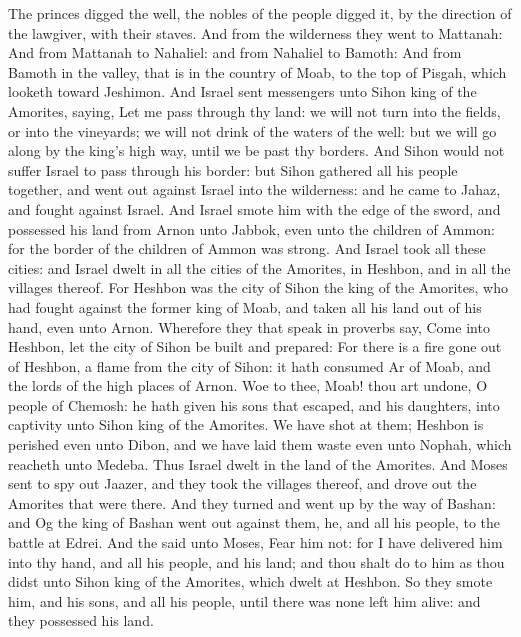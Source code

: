 \begin{biblechapter}
\verse The princes digged the well, the nobles of the people digged it, by the direction of the lawgiver, with their staves. And from the wilderness they went to Mattanah:
\verse And from Mattanah to Nahaliel: and from Nahaliel to Bamoth:
\verse And from Bamoth in the valley, that is in the country of Moab, to the top of Pisgah, which looketh toward Jeshimon.
 And Israel sent messengers unto Sihon king of the Amorites, saying,
\verse Let me pass through thy land: we will not turn into the fields, or into the vineyards; we will not drink of the waters of the well: but we will go along by the king's high way, until we be past thy borders.
\verse And Sihon would not suffer Israel to pass through his border: but Sihon gathered all his people together, and went out against Israel into the wilderness: and he came to Jahaz, and fought against Israel.
\verse And Israel smote him with the edge of the sword, and possessed his land from Arnon unto Jabbok, even unto the children of Ammon: for the border of the children of Ammon was strong.
\verse And Israel took all these cities: and Israel dwelt in all the cities of the Amorites, in Heshbon, and in all the villages thereof.
\verse For Heshbon was the city of Sihon the king of the Amorites, who had fought against the former king of Moab, and taken all his land out of his hand, even unto Arnon.
\verse Wherefore they that speak in proverbs say, Come into Heshbon, let the city of Sihon be built and prepared:
\verse For there is a fire gone out of Heshbon, a flame from the city of Sihon: it hath consumed Ar of Moab, and the lords of the high places of Arnon.
\verse Woe to thee, Moab! thou art undone, O people of Chemosh: he hath given his sons that escaped, and his daughters, into captivity unto Sihon king of the Amorites.
\verse We have shot at them; Heshbon is perished even unto Dibon, and we have laid them waste even unto Nophah, which reacheth unto Medeba.
\verse Thus Israel dwelt in the land of the Amorites.
\verse And Moses sent to spy out Jaazer, and they took the villages thereof, and drove out the Amorites that were there.
\verse And they turned and went up by the way of Bashan: and Og the king of Bashan went out against them, he, and all his people, to the battle at Edrei.
\verse And the \LORD said unto Moses, Fear him not: for I have delivered him into thy hand, and all his people, and his land; and thou shalt do to him as thou didst unto Sihon king of the Amorites, which dwelt at Heshbon.
\verse So they smote him, and his sons, and all his people, until there was none left him alive: and they possessed his land.
\end{biblechapter}

